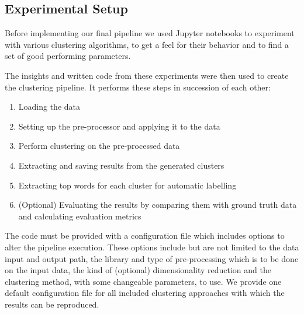\subsection{Experimental Setup}
Before implementing our final pipeline we used Jupyter notebooks to experiment with various clustering algorithms, to get a feel for their behavior and to find a set of good performing parameters.

The insights and written code from these experiments were then used to create the clustering pipeline. It performs these steps in succession of each other:
\begin{enumerate}
    \item Loading the data
    \item Setting up the pre-processor and applying it to the data
    \item Perform clustering on the pre-processed data
    \item Extracting and saving results from the generated clusters
    \item Extracting top words for each cluster for automatic labelling
    \item (Optional) Evaluating the results by comparing them with ground truth data and calculating evaluation metrics
\end{enumerate}

The code must be provided with a configuration file which includes options to alter the pipeline execution. These options include but are not limited to the data input and output path, the library and type of pre-processing which is to be done on the input data, the kind of (optional) dimensionality reduction and the clustering method, with some changeable parameters, to use.
We provide one default configuration file for all included clustering approaches with which the results can be reproduced. 
